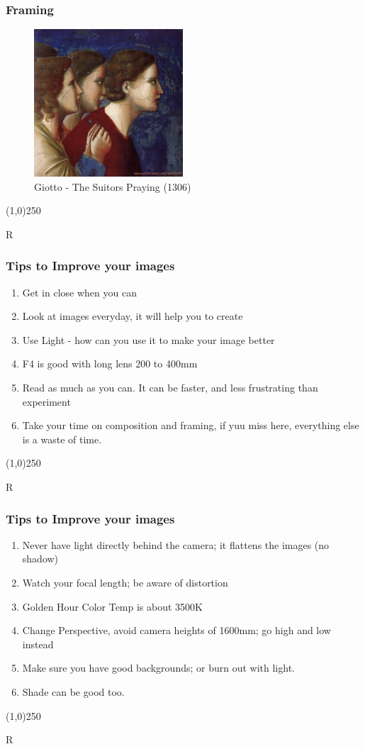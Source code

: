 \begin{frame}
\frametitle{Framing}
\begin{figure}
	\centering
	\includegraphics[height=5.5cm]{img/CandC/giotto3a}
	\caption{Giotto - The Suitors Praying (1306)}
	\label{fig:giotto3a}
\end{figure}
\end{frame}
\begin{center}\line(1,0){250}\end{center}R


\begin{frame}
\frametitle{Tips to Improve your images}
\begin{enumerate}
	\item Get in close when you can
	\item Look at images everyday, it will help you to create
	\item Use Light - how can you use it to make your image better
	\item F4 is good with long lens 200 to 400mm
	\item Read as much as you can.  It can be faster, and less frustrating than experiment
	\item Take your time on composition and framing, if yuu miss here, everything else is a waste of time.
\end{enumerate}
\end{frame}
\begin{center}\line(1,0){250}\end{center}R




\begin{frame}
\frametitle{Tips to Improve your images}
\begin{enumerate}
	\item Never have light directly behind the camera; it flattens the images (no shadow)
	\item Watch your focal length; be aware of distortion
	\item Golden Hour Color Temp is about 3500K
	\item Change Perspective, avoid camera heights of 1600mm; go high and low instead
	\item Make sure you have good backgrounds; or burn out with light.
	\item Shade can be good too.  
\end{enumerate}
\end{frame}
\begin{center}\line(1,0){250}\end{center}R



